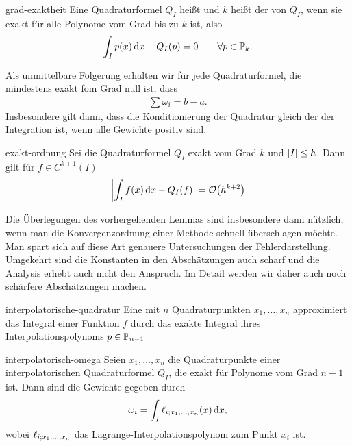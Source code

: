 \begin{Definition}{grad-exaktheit}
  Eine Quadraturformel $Q_I$ heißt  und $k$
  heißt der  von $Q_I$, wenn sie exakt für
  alle Polynome vom Grad bis zu $k$ ist, also
  \begin{gather}
    \int_I p(x)\dx - Q_{I}(p) = 0 \qquad \forall p\in \P_k.
  \end{gather}
\end{Definition}

\begin{remark}
  Als unmittelbare Folgerung erhalten wir für jede Quadraturformel,
  die mindestens exakt fom Grad null ist, dass
  \begin{gather}
    \sum \omega_i = b-a.
  \end{gather}
  Insbesondere gilt dann, dass die Konditionierung der Quadratur
  gleich der der Integration ist, wenn alle Gewichte positiv sind.
\end{remark}

\begin{Lemma}{exakt-ordnung}
  Sei die Quadraturformel $Q_I$ exakt vom Grad $k$ und
  $\abs{I} \le h$. Dann gilt für $f\in C^{k+1}(I)$
  \begin{gather}
    \left|\int_{I} f(x)\dx - Q_{I}(f)\right| = \bigo\bigl(h^{k+2}\bigr)
  \end{gather}
\end{Lemma}

\begin{remark}
  Die Überlegungen des vorhergehenden Lemmas sind insbesondere dann
  nützlich, wenn man die Konvergenzordnung einer Methode schnell
  überschlagen möchte. Man spart sich auf diese Art genauere
  Untersuchungen der Fehlerdarstellung. Umgekehrt sind die Konstanten
  in den Abschätzungen auch scharf und die Analysis erhebt auch nicht
  den Anspruch. Im Detail werden wir daher auch noch schärfere
  Abschätzungen machen.
\end{remark}

\begin{Definition}{interpolatorische-quadratur}
  Eine  mit $n$
  Quadraturpunkten $x_1,\dots,x_n$ approximiert das Integral einer
  Funktion $f$ durch das exakte Integral ihres Interpolationspolynoms
  $p\in \P_{n-1}$
\end{Definition}

\begin{Lemma}{interpolatorisch-omega}
  Seien $x_1,\dots,x_n$ die Quadraturpunkte einer interpolatorischen
  Quadraturformel $Q_I$, die exakt für Polynome vom Grad $n-1$
  ist. Dann sind die Gewichte gegeben durch
  \begin{gather}
    \omega_i = \int_I \plagrange_{i;x_1,\dots,x_n}(x)\dx,
  \end{gather}
  wobei $\plagrange_{i;x_1,\dots,x_n}$ das
  Lagrange-Interpolationspolynom zum Punkt $x_i$ ist.
\end{Lemma}


